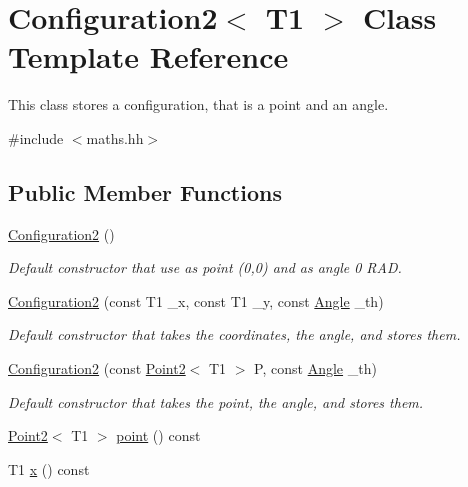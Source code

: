 \hypertarget{class_configuration2}{}\section{Configuration2$<$ T1 $>$ Class Template Reference}
\label{class_configuration2}


This class stores a configuration, that is a point and an angle.  




{\ttfamily \#include $<$maths.\+hh$>$}

\subsection*{Public Member Functions}
\begin{DoxyCompactItemize}
\item 
\mbox{\hyperlink{class_configuration2_a6fc5a5a723da700b6a869db09ec5614f}{Configuration2}} ()
\begin{DoxyCompactList}\small\item\em Default constructor that use as point (0,0) and as angle 0 R\+AD. \end{DoxyCompactList}\item 
\mbox{\hyperlink{class_configuration2_a09e73e9fe2ae9a67a037a0b3d0619047}{Configuration2}} (const T1 \+\_\+x, const T1 \+\_\+y, const \mbox{\hyperlink{class_angle}{Angle}} \+\_\+th)
\begin{DoxyCompactList}\small\item\em Default constructor that takes the coordinates, the angle, and stores them. \end{DoxyCompactList}\item 
\mbox{\hyperlink{class_configuration2_aab6ae19e1f7703bbfd9e1d0be1ca76a5}{Configuration2}} (const \mbox{\hyperlink{class_point2}{Point2}}$<$ T1 $>$ P, const \mbox{\hyperlink{class_angle}{Angle}} \+\_\+th)
\begin{DoxyCompactList}\small\item\em Default constructor that takes the point, the angle, and stores them. \end{DoxyCompactList}\item 
\mbox{\hyperlink{class_point2}{Point2}}$<$ T1 $>$ \mbox{\hyperlink{class_configuration2_a15ce37ad4eae9f4a980fc3578765984d}{point}} () const
\item 
T1 \mbox{\hyperlink{class_configuration2_a430b4b412cbdad376feec03c52bde56f}{x}} () const
\item 

\end{DoxyCompactItemize}
